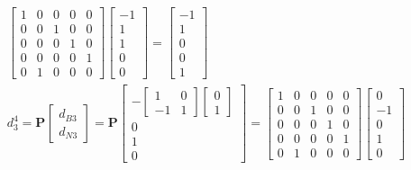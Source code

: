 \documentclass[11pt]{article}
\begin{document}
\begin{enumerate}
\begin{align*}
\begin{bmatrix}
        1 & 0 & 0 & 0 & 0 \\
        0 & 0 & 1 & 0 & 0 \\
        0 & 0 & 0 & 1 & 0 \\
        0 & 0 & 0 & 0 & 1 \\
        0 & 1 & 0 & 0 & 0
      \end{bmatrix}
      \begin{bmatrix}
        -1 \\ 1 \\ 1 \\ 0 \\ 0 
      \end{bmatrix}
      =
      \begin{bmatrix}
        -1 \\ 1 \\ 0 \\ 0 \\ 1 
      \end{bmatrix}
      \\
      d_3^4 = \textbf{P}
      \begin{bmatrix}
         d_{B3} \\ d_{N3}
      \end{bmatrix}
      =
      \textbf{P}
      \begin{bmatrix}
        -
        \begin{bmatrix}
         1 & 0 \\ -1 & 1   
        \end{bmatrix}
        \begin{bmatrix}
            0 \\ 1
        \end{bmatrix} \\
        0 \\ 1 \\ 0
      \end{bmatrix}
      = 
      \begin{bmatrix}
        1 & 0 & 0 & 0 & 0 \\
        0 & 0 & 1 & 0 & 0 \\
        0 & 0 & 0 & 1 & 0 \\
        0 & 0 & 0 & 0 & 1 \\
        0 & 1 & 0 & 0 & 0
      \end{bmatrix}
      \begin{bmatrix}
        0 \\ -1 \\ 0 \\ 1 \\ 0

\end{bmatrix}
\end{align*}
\end{enumerate}
\end{document}

